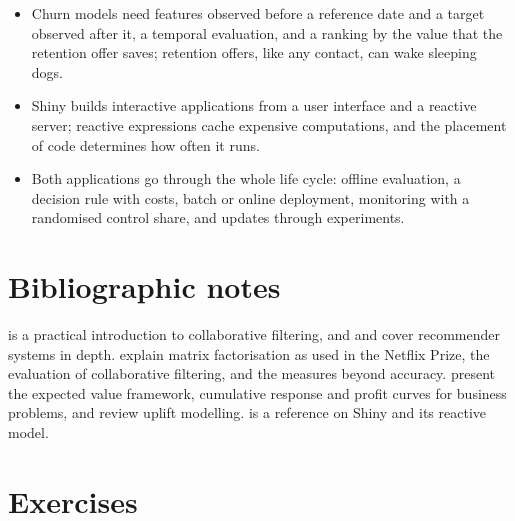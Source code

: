 \begin{itemize}
        targeting sure things and sleeping dogs.
\item Churn models need features observed before a reference date and a target observed after it, a
temporal evaluation, and a ranking by the value that the retention offer saves; retention offers, like
any contact, can wake sleeping dogs.
  \item Shiny builds interactive applications from a user interface and a reactive server; reactive expressions cache expensive
        computations, and the placement of code determines how often it runs.
\item Both applications go through the whole life cycle: offline evaluation, a decision rule with costs,
batch or online deployment, monitoring with a randomised control share, and updates through experiments.
\end{itemize}

\section*{Bibliographic notes}

\citet{segaran2007programming} is a practical introduction to collaborative filtering, and \citet{aggarwal2016recommender} and
\citet{ricci2022recommender} cover recommender systems in depth. \citet{koren2009matrix} explain matrix factorisation as used in the
Netflix Prize, \citet{herlocker2004evaluating} the evaluation of collaborative filtering, and \citet{kaminskas2016diversity} the measures
beyond accuracy. \citet{provost2013data} present the expected value framework, cumulative response and profit curves for business
problems, and \citet{gutierrez2017causal} review uplift modelling. \citet{wickham2021mastering} is a reference on Shiny and its reactive
model.

\section*{Exercises}


